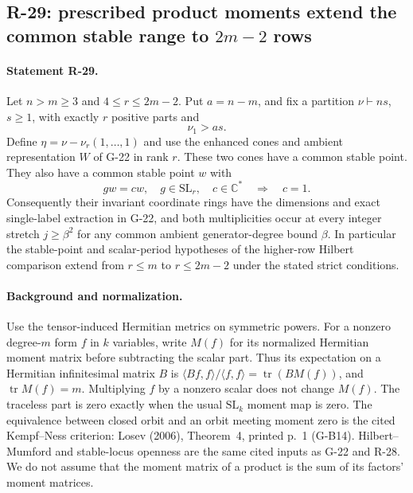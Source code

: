 \subsection{R-29: prescribed product moments extend the common stable range to $2m-2$ rows}

\paragraph{Statement R-29.}
Let $n>m\geq3$ and $4\leq r\leq2m-2$. Put $a=n-m$,
and fix a partition $\nu\vdash ns$, $s\geq1$, with exactly
$r$ positive parts and
\[
 \nu_1>as.
\]
Define $\eta=\nu-\nu_r(1,\ldots,1)$ and use the enhanced
cones and ambient representation $W$ of G-22 in rank $r$.
These two cones have a common stable point. They also have a
common stable point $w$ with
\begin{equation}\label{R29:no_scaling}
 g w=cw,\quad g\in\mathrm{SL}_r,\quad c\in\mathbb C^*
       \quad\Longrightarrow\quad c=1.
\end{equation}
Consequently their invariant coordinate rings have the
dimensions and exact single-label extraction in G-22, and
both multiplicities occur at every integer stretch
$j\geq\beta^2$ for any common ambient generator-degree bound
$\beta$. In particular the stable-point and scalar-period
hypotheses of the higher-row Hilbert comparison extend from
$r\leq m$ to $r\leq2m-2$ under the stated strict conditions.

\paragraph{Background and normalization.}
Use the tensor-induced Hermitian metrics on symmetric powers.
For a nonzero degree-$m$ form $f$ in $k$ variables, write
$M(f)$ for its normalized Hermitian moment matrix before
subtracting the scalar part. Thus its expectation on a
Hermitian infinitesimal matrix $B$ is
$\langle Bf,f\rangle/\langle f,f\rangle
 =\operatorname{tr}(BM(f))$, and $\operatorname{tr}M(f)=m$.
Multiplying $f$ by a nonzero scalar does not change $M(f)$.
The traceless part is zero exactly when the usual
$\mathrm{SL}_k$ moment map is zero. The equivalence between
closed orbit and an orbit meeting moment zero is the cited
Kempf--Ness criterion: Losev (2006), Theorem~4, printed p.~1
(G-B14). Hilbert--Mumford and stable-locus openness are the
same cited inputs as G-22 and R-28. We do not assume that
the moment matrix of a product is the sum of its factors'
moment matrices.

